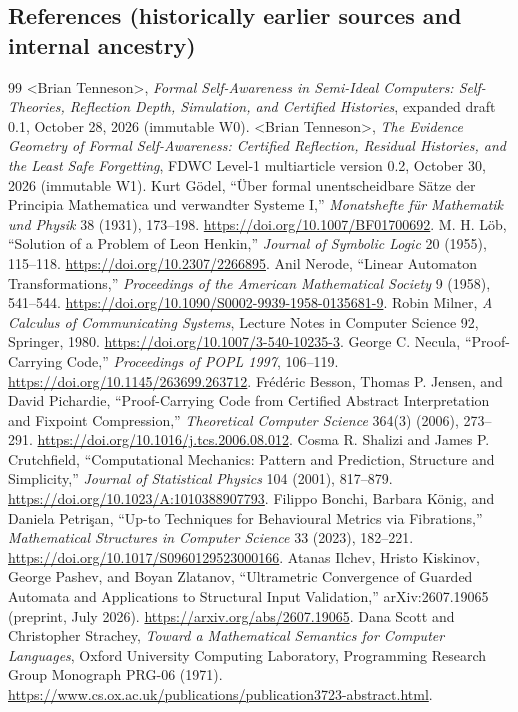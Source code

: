 \documentclass[11pt,letterpaper]{article}
\begin{document}
\subsection*{References (historically earlier sources and internal ancestry)}
\begin{thebibliography}{99}
\small
{} \textless Brian Tenneson\textgreater, \emph{Formal Self-Awareness in Semi-Ideal Computers: Self-Theories, Reflection Depth, Simulation, and Certified Histories}, expanded draft 0.1, October 28, 2026 (immutable W0).
 \textless Brian Tenneson\textgreater, \emph{The Evidence Geometry of Formal Self-Awareness: Certified Reflection, Residual Histories, and the Least Safe Forgetting}, FDWC Level-1 multiarticle version 0.2, October 30, 2026 (immutable W1).
 Kurt G{\"o}del, ``{\"U}ber formal unentscheidbare S{\"a}tze der Principia Mathematica und verwandter Systeme I,'' \emph{Monatshefte f{\"u}r Mathematik und Physik} 38 (1931), 173--198. \url{https://doi.org/10.1007/BF01700692}.
 M. H. L{\"o}b, ``Solution of a Problem of Leon Henkin,'' \emph{Journal of Symbolic Logic} 20 (1955), 115--118. \url{https://doi.org/10.2307/2266895}.
 Anil Nerode, ``Linear Automaton Transformations,'' \emph{Proceedings of the American Mathematical Society} 9 (1958), 541--544. \url{https://doi.org/10.1090/S0002-9939-1958-0135681-9}.
 Robin Milner, \emph{A Calculus of Communicating Systems}, Lecture Notes in Computer Science 92, Springer, 1980. \url{https://doi.org/10.1007/3-540-10235-3}.
 George C. Necula, ``Proof-Carrying Code,'' \emph{Proceedings of POPL 1997}, 106--119. \url{https://doi.org/10.1145/263699.263712}.
 Fr\'{e}d\'{e}ric Besson, Thomas P. Jensen, and David Pichardie, ``Proof-Carrying Code from Certified Abstract Interpretation and Fixpoint Compression,'' \emph{Theoretical Computer Science} 364(3) (2006), 273--291. \url{https://doi.org/10.1016/j.tcs.2006.08.012}.
 Cosma R. Shalizi and James P. Crutchfield, ``Computational Mechanics: Pattern and Prediction, Structure and Simplicity,'' \emph{Journal of Statistical Physics} 104 (2001), 817--879. \url{https://doi.org/10.1023/A:1010388907793}.
 Filippo Bonchi, Barbara K{\"o}nig, and Daniela Petri{\c s}an, ``Up-to Techniques for Behavioural Metrics via Fibrations,'' \emph{Mathematical Structures in Computer Science} 33 (2023), 182--221. \url{https://doi.org/10.1017/S0960129523000166}.
 Atanas Ilchev, Hristo Kiskinov, George Pashev, and Boyan Zlatanov, ``Ultrametric Convergence of Guarded Automata and Applications to Structural Input Validation,'' arXiv:2607.19065 (preprint, July 2026). \url{https://arxiv.org/abs/2607.19065}.
 Dana Scott and Christopher Strachey, \emph{Toward a Mathematical Semantics for Computer Languages}, Oxford University Computing Laboratory, Programming Research Group Monograph PRG-06 (1971). \url{https://www.cs.ox.ac.uk/publications/publication3723-abstract.html}.
\end{thebibliography}
\clearpage
\end{document}
